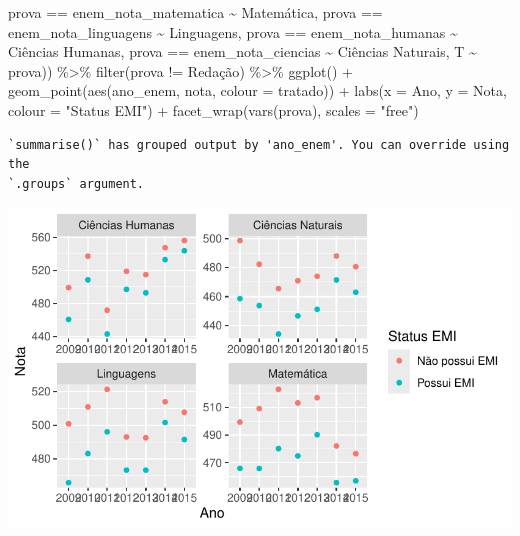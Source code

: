 \documentclass[
  letterpaper,
  DIV=11,
  numbers=noendperiod]{scrartcl}
\newenvironment{Shaded}{\begin{snugshade}}{\end{snugshade}}
\newcommand{\AttributeTok}[1]{\textcolor[rgb]{0.40,0.45,0.13}{#1}}
\newcommand{\FunctionTok}[1]{\textcolor[rgb]{0.28,0.35,0.67}{#1}}
\newcommand{\NormalTok}[1]{\textcolor[rgb]{0.00,0.23,0.31}{#1}}
\newcommand{\SpecialCharTok}[1]{\textcolor[rgb]{0.37,0.37,0.37}{#1}}
\newcommand{\StringTok}[1]{\textcolor[rgb]{0.13,0.47,0.30}{#1}}
\begin{document}
\begin{Shaded}
\begin{Highlighting}[]
\NormalTok{                           prova }\SpecialCharTok{==} \StringTok{\textquotesingle{}enem\_nota\_matematica\textquotesingle{}} \SpecialCharTok{\textasciitilde{}} \StringTok{\textquotesingle{}Matemática\textquotesingle{}}\NormalTok{,}
\NormalTok{                           prova }\SpecialCharTok{==} \StringTok{\textquotesingle{}enem\_nota\_linguagens\textquotesingle{}} \SpecialCharTok{\textasciitilde{}} \StringTok{\textquotesingle{}Linguagens\textquotesingle{}}\NormalTok{,}
\NormalTok{                           prova }\SpecialCharTok{==} \StringTok{\textquotesingle{}enem\_nota\_humanas\textquotesingle{}} \SpecialCharTok{\textasciitilde{}} \StringTok{\textquotesingle{}Ciências Humanas\textquotesingle{}}\NormalTok{,}
\NormalTok{                           prova }\SpecialCharTok{==} \StringTok{\textquotesingle{}enem\_nota\_ciencias\textquotesingle{}} \SpecialCharTok{\textasciitilde{}} \StringTok{\textquotesingle{}Ciências Naturais\textquotesingle{}}\NormalTok{,}
\NormalTok{                           T }\SpecialCharTok{\textasciitilde{}}\NormalTok{ prova)) }\SpecialCharTok{\%\textgreater{}\%} 
  \FunctionTok{filter}\NormalTok{(prova }\SpecialCharTok{!=} \StringTok{\textquotesingle{}Redação\textquotesingle{}}\NormalTok{) }\SpecialCharTok{\%\textgreater{}\%} 
  \FunctionTok{ggplot}\NormalTok{() }\SpecialCharTok{+}
  \FunctionTok{geom\_point}\NormalTok{(}\FunctionTok{aes}\NormalTok{(ano\_enem, nota, }\AttributeTok{colour =}\NormalTok{ tratado)) }\SpecialCharTok{+}
  \FunctionTok{labs}\NormalTok{(}\AttributeTok{x =} \StringTok{\textquotesingle{}Ano\textquotesingle{}}\NormalTok{, }\AttributeTok{y =} \StringTok{\textquotesingle{}Nota\textquotesingle{}}\NormalTok{, }\AttributeTok{colour =} \StringTok{"Status EMI"}\NormalTok{) }\SpecialCharTok{+}
  \FunctionTok{facet\_wrap}\NormalTok{(}\FunctionTok{vars}\NormalTok{(prova), }\AttributeTok{scales =} \StringTok{"free"}\NormalTok{)}
\end{Highlighting}
\end{Shaded}

\begin{verbatim}
`summarise()` has grouped output by 'ano_enem'. You can override using the
`.groups` argument.
\end{verbatim}

\includegraphics[width=1\textwidth,height=1\textheight]{script_files/figure-latex/unnamed-chunk-10-1.pdf}
\end{document}
